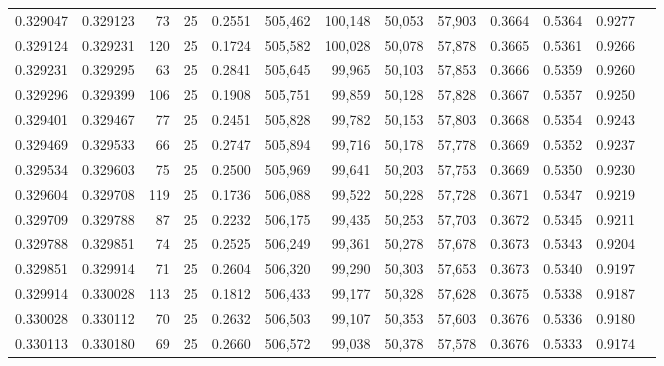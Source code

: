 \begin{tabular}{rrrrrrrrrrrrr}
0.329047 & 0.329123 &    73 &  25 &                                     0.2551 & 505,462 & 100,148 &  50,053 &  57,903 & 0.3664 & 0.5364 & 0.9277 \\
0.329124 & 0.329231 &   120 &  25 &                                     0.1724 & 505,582 & 100,028 &  50,078 &  57,878 & 0.3665 & 0.5361 & 0.9266 \\
0.329231 & 0.329295 &    63 &  25 &                                     0.2841 & 505,645 &  99,965 &  50,103 &  57,853 & 0.3666 & 0.5359 & 0.9260 \\
0.329296 & 0.329399 &   106 &  25 &                                     0.1908 & 505,751 &  99,859 &  50,128 &  57,828 & 0.3667 & 0.5357 & 0.9250 \\
0.329401 & 0.329467 &    77 &  25 &                                     0.2451 & 505,828 &  99,782 &  50,153 &  57,803 & 0.3668 & 0.5354 & 0.9243 \\
0.329469 & 0.329533 &    66 &  25 &                                     0.2747 & 505,894 &  99,716 &  50,178 &  57,778 & 0.3669 & 0.5352 & 0.9237 \\
0.329534 & 0.329603 &    75 &  25 &                                     0.2500 & 505,969 &  99,641 &  50,203 &  57,753 & 0.3669 & 0.5350 & 0.9230 \\
0.329604 & 0.329708 &   119 &  25 &                                     0.1736 & 506,088 &  99,522 &  50,228 &  57,728 & 0.3671 & 0.5347 & 0.9219 \\
0.329709 & 0.329788 &    87 &  25 &                                     0.2232 & 506,175 &  99,435 &  50,253 &  57,703 & 0.3672 & 0.5345 & 0.9211 \\
0.329788 & 0.329851 &    74 &  25 &                                     0.2525 & 506,249 &  99,361 &  50,278 &  57,678 & 0.3673 & 0.5343 & 0.9204 \\
0.329851 & 0.329914 &    71 &  25 &                                     0.2604 & 506,320 &  99,290 &  50,303 &  57,653 & 0.3673 & 0.5340 & 0.9197 \\
0.329914 & 0.330028 &   113 &  25 &                                     0.1812 & 506,433 &  99,177 &  50,328 &  57,628 & 0.3675 & 0.5338 & 0.9187 \\
0.330028 & 0.330112 &    70 &  25 &                                     0.2632 & 506,503 &  99,107 &  50,353 &  57,603 & 0.3676 & 0.5336 & 0.9180 \\
0.330113 & 0.330180 &    69 &  25 &                                     0.2660 & 506,572 &  99,038 &  50,378 &  57,578 & 0.3676 & 0.5333 & 0.9174 \\

\end{tabular}
